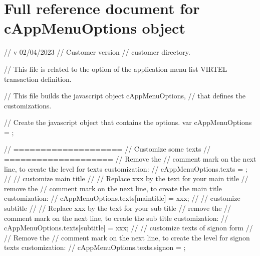\documentclass[letterpaper,10pt,english]{sphinxmanual}
\begin{document}
\newpage


\section{Full reference document for cAppMenuOptions object}
\label{\detokenize{Customization:full-reference-document-for-cappmenuoptions-object}}
\begin{sphinxVerbatim}[commandchars=\\\{\}]
// v 02/04/2023
// Customer version
// customer directory.

// This file is related to the option of the application menu list VIRTEL transaction definition.


// This file builds the javascript object cAppMenuOptions,
// that defines the customizations.

// Create the javascript object that contains the options.
var cAppMenuOptions = \PYGZob{}\PYGZcb{};

// ====================
// Customize some texts
// ====================
// Remove the // comment mark on the next line, to create the level for texts customization:
// cAppMenuOptions.texts = \PYGZob{}\PYGZcb{};
//
// customize main title
// \PYGZhy{}\PYGZhy{}\PYGZhy{}\PYGZhy{}\PYGZhy{}\PYGZhy{}\PYGZhy{}\PYGZhy{}\PYGZhy{}\PYGZhy{}\PYGZhy{}\PYGZhy{}\PYGZhy{}\PYGZhy{}\PYGZhy{}\PYGZhy{}\PYGZhy{}\PYGZhy{}\PYGZhy{}\PYGZhy{}
// Replace xxx by the text for your main title
// remove the // comment mark on the next line, to create the main title customization:
// cAppMenuOptions.texts[\PYGZdq{}main\PYGZhy{}title\PYGZdq{}] = \PYGZdq{}xxx\PYGZdq{};
//
// customize subtitle
// \PYGZhy{}\PYGZhy{}\PYGZhy{}\PYGZhy{}\PYGZhy{}\PYGZhy{}\PYGZhy{}\PYGZhy{}\PYGZhy{}\PYGZhy{}\PYGZhy{}\PYGZhy{}\PYGZhy{}\PYGZhy{}\PYGZhy{}\PYGZhy{}\PYGZhy{}\PYGZhy{}
// Replace xxx by the text for your sub title
// remove the // comment mark on the next line, to create the sub title customization:
// cAppMenuOptions.texts[\PYGZdq{}sub\PYGZhy{}title\PYGZdq{}] = \PYGZdq{}xxx\PYGZdq{};
//
// customize texts of signon form
// \PYGZhy{}\PYGZhy{}\PYGZhy{}\PYGZhy{}\PYGZhy{}\PYGZhy{}\PYGZhy{}\PYGZhy{}\PYGZhy{}\PYGZhy{}\PYGZhy{}\PYGZhy{}\PYGZhy{}\PYGZhy{}\PYGZhy{}\PYGZhy{}\PYGZhy{}\PYGZhy{}\PYGZhy{}\PYGZhy{}\PYGZhy{}\PYGZhy{}\PYGZhy{}\PYGZhy{}\PYGZhy{}\PYGZhy{}\PYGZhy{}\PYGZhy{}\PYGZhy{}\PYGZhy{}
// Remove the // comment mark on the next line, to create the level for signon texts customization:
// cAppMenuOptions.texts.signon = \PYGZob{}\PYGZcb{};


\end{sphinxVerbatim}
\end{document}
